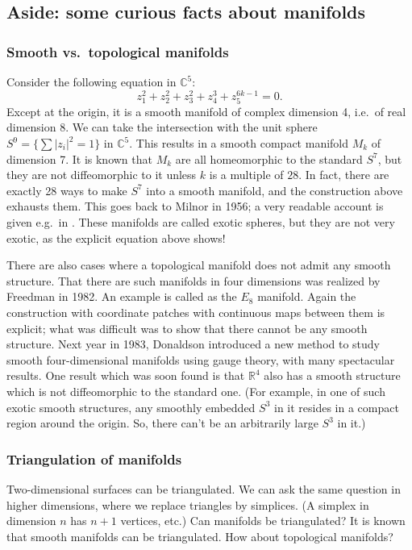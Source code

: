 \documentclass[12pt]{article}
\numberwithin{equation}{section}
\theoremstyle{remark}
\def\bC{\mathbb{C}}
\def\bR{\mathbb{R}}
\begin{document}
\subsection{Aside: some curious facts about manifolds}
\label{sec:smooth-vs-topological}

\subsubsection{Smooth vs.~topological manifolds}
Consider the following equation in $\bC^5$:
\begin{equation}
z_1^2+z_2^2+z_3^2+z_4^3+z_5^{6k-1}=0.  
\end{equation} Except at the origin, it is a smooth manifold of complex dimension 4, 
i.e.~of real dimension 8.
We can take the intersection with the unit sphere $S^9=\{\sum|z_i|^2=1\}$ in $\bC^5$.
This results in a smooth compact manifold $M_k$ of dimension 7.
It is known that $M_k$ are all homeomorphic to the standard $S^7$,
but they are not diffeomorphic to it unless $k$ is a multiple of $28$.
In fact, there are exactly 28 ways to make $S^7$ into a smooth manifold,
and the construction above exhausts them.
This goes back to Milnor in 1956; a very readable account is given e.g.~in \cite{MeerThesis}.
These manifolds are called exotic spheres, 
but they are not very exotic, as the explicit equation above shows!

There are also cases where a topological manifold does not admit any smooth structure.
That there are such manifolds in four dimensions was realized by Freedman \cite{Freedman} in 1982.
An example is called as the $E_8$ manifold.
Again the construction with coordinate patches with continuous maps between them is explicit;
what was difficult was to show that there cannot be any smooth structure. 
Next year in 1983, Donaldson \cite{Donaldson} 
introduced a new method to study smooth four-dimensional manifolds
using gauge theory, with many spectacular results.
One result which was soon found is that $\bR^4$ also has a smooth structure 
which is not diffeomorphic to the standard one.
(For example, in one of such exotic smooth structures, 
any smoothly embedded $S^3$ in it resides in a compact region around the origin.
So, there can't be an arbitrarily large $S^3$ in it.)

\subsubsection{Triangulation of manifolds}
Two-dimensional surfaces can be triangulated. 
We can ask the same question in higher dimensions,
where we replace triangles by simplices. (A simplex in dimension $n$ has $n+1$ vertices, etc.)
Can manifolds be triangulated?
It is known that smooth manifolds can be triangulated. 
How about topological manifolds?
\end{document}
